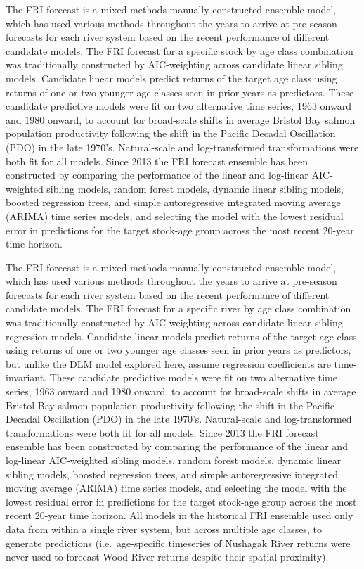 \documentclass[
]{article}
\begin{document}
The FRI forecast is a mixed-methods manually constructed ensemble model, which has used various methods throughout the years to arrive at pre-season forecasts for each river system based on the recent performance of different candidate models. The FRI forecast for a specific stock by age class combination was traditionally constructed by AIC-weighting across candidate linear sibling models. Candidate linear models predict returns of the target age class using returns of one or two younger age classes seen in prior years as predictors. These candidate predictive models were fit on two alternative time series, 1963 onward and 1980 onward, to account for broad-scale shifts in average Bristol Bay salmon population productivity following the shift in the Pacific Decadal Oscillation (PDO) in the late 1970's. Natural-scale and log-transformed transformations were both fit for all models. Since 2013 the FRI forecast ensemble has been constructed by comparing the performance of the linear and log-linear AIC-weighted sibling models, random forest models, dynamic linear sibling models, boosted regression trees, and simple autoregressive integrated moving average (ARIMA) time series models, and selecting the model with the lowest residual error in predictions for the target stock-age group across the most recent 20-year time horizon.

The FRI forecast is a mixed-methods manually constructed ensemble model, which has used various methods throughout the years to arrive at pre-season forecasts for each river system based on the recent performance of different candidate models. The FRI forecast for a specific river by age class combination was traditionally constructed by AIC-weighting across candidate linear sibling regression models. Candidate linear models predict returns of the target age class using returns of one or two younger age classes seen in prior years as predictors, but unlike the DLM model explored here, assume regression coefficients are time-invariant. These candidate predictive models were fit on two alternative time series, 1963 onward and 1980 onward, to account for broad-scale shifts in average Bristol Bay salmon population productivity following the shift in the Pacific Decadal Oscillation (PDO) in the late 1970's. Natural-scale and log-transformed transformations were both fit for all models. Since 2013 the FRI forecast ensemble has been constructed by comparing the performance of the linear and log-linear AIC-weighted sibling models, random forest models, dynamic linear sibling models, boosted regression trees, and simple autoregressive integrated moving average (ARIMA) time series models, and selecting the model with the lowest residual error in predictions for the target stock-age group across the most recent 20-year time horizon. All models in the historical FRI ensemble used only data from within a single river system, but across multiple age classes, to generate predictions (i.e.~age-specific timeseries of Nushagak River returns were never used to forecast Wood River returns despite their spatial proximity).
\end{document}
